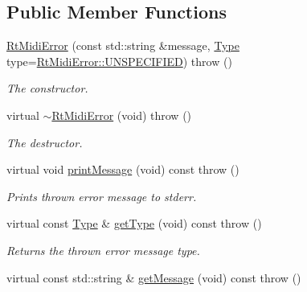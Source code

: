 \subsection*{Public Member Functions}
\begin{DoxyCompactItemize}
\item 
\hyperlink{class_rt_midi_error_af0952e4900c79dc0928a40fc62cb68d1}{Rt\+Midi\+Error} (const std\+::string \&message, \hyperlink{class_rt_midi_error_a741314057cec5fb8c743c12f284905ee}{Type} type=\hyperlink{class_rt_midi_error_a741314057cec5fb8c743c12f284905eeabd80a28d9fedd9a861c72d3fae096a79}{Rt\+Midi\+Error\+::\+U\+N\+S\+P\+E\+C\+I\+F\+I\+ED})  throw ()\hypertarget{class_rt_midi_error_af0952e4900c79dc0928a40fc62cb68d1}{}\label{class_rt_midi_error_af0952e4900c79dc0928a40fc62cb68d1}

\begin{DoxyCompactList}\small\item\em The constructor. \end{DoxyCompactList}\item 
virtual \hyperlink{class_rt_midi_error_ac3223037a1c192d37fbd285e4a52878f}{$\sim$\+Rt\+Midi\+Error} (void)  throw ()\hypertarget{class_rt_midi_error_ac3223037a1c192d37fbd285e4a52878f}{}\label{class_rt_midi_error_ac3223037a1c192d37fbd285e4a52878f}

\begin{DoxyCompactList}\small\item\em The destructor. \end{DoxyCompactList}\item 
virtual void \hyperlink{class_rt_midi_error_a7f45ae29b66b25817a7aa7b4ea81ab71}{print\+Message} (void) const   throw ()\hypertarget{class_rt_midi_error_a7f45ae29b66b25817a7aa7b4ea81ab71}{}\label{class_rt_midi_error_a7f45ae29b66b25817a7aa7b4ea81ab71}

\begin{DoxyCompactList}\small\item\em Prints thrown error message to stderr. \end{DoxyCompactList}\item 
virtual const \hyperlink{class_rt_midi_error_a741314057cec5fb8c743c12f284905ee}{Type} \& \hyperlink{class_rt_midi_error_acd8f1c1d2c6cd5bf678700ed9f106061}{get\+Type} (void) const   throw ()\hypertarget{class_rt_midi_error_acd8f1c1d2c6cd5bf678700ed9f106061}{}\label{class_rt_midi_error_acd8f1c1d2c6cd5bf678700ed9f106061}

\begin{DoxyCompactList}\small\item\em Returns the thrown error message type. \end{DoxyCompactList}\item 
virtual const std\+::string \& \hyperlink{class_rt_midi_error_acc182a8406954427c77c9db6f6907fa7}{get\+Message} (void) const   throw ()\hypertarget{class_rt_midi_error_acc182a8406954427c77c9db6f6907fa7}{}\label{class_rt_midi_error_acc182a8406954427c77c9db6f6907fa7}


\end{DoxyCompactItemize}
